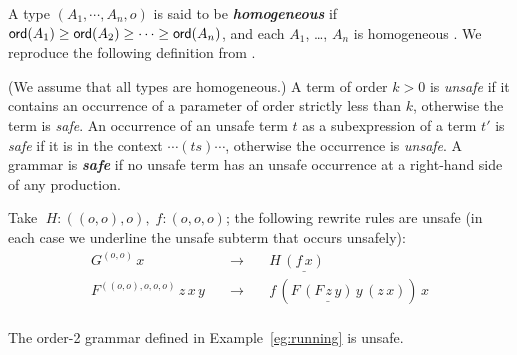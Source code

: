 \documentclass{llncs}
\newcommand\defname[1]{{\bf\em #1}\index{#1}}
\begin{document}
A type $(A_1, \cdots, A_n, o)$ is said to be \defname{homogeneous} if
${\sf ord}(A_1) \geq {\sf ord}(A_2)\geq \cdots \geq {\sf ord}(A_n)$, and each $A_1$,
\ldots, $A_n$ is homogeneous \cite{KNU02}.  We reproduce the following
definition from \cite{KNU02}.

\begin{definition}\rm
  (We assume that all types are homogeneous.) A term of order $k > 0$
  is \emph{unsafe} if it contains an occurrence of a parameter of
  order strictly less than $k$, otherwise the term is \emph{safe}. An
  occurrence of an unsafe term $t$ as a subexpression of a term $t'$
  is \emph{safe} if it is in the context $\cdots (ts) \cdots$,
  otherwise the occurrence is \emph{unsafe}. A grammar is
  \defname{safe} if no unsafe term has an unsafe occurrence at a
  right-hand side of any production.
\end{definition}

\begin{example}\begin{inparaenum}[(i)] \item Take $\; H : ((o, o), o), \; f : (o, o, o)$; the
    following rewrite rules are unsafe (in each case we underline the
    unsafe subterm that occurs unsafely):
\[\begin{array}{rll}
G^{(o, o)} \, x & \quad \rightarrow \quad & H \, \underline{(f \, {x})} \\
F^{((o, o), o, o, o)} \, z \, x \, y & \quad \rightarrow \quad & f \, (F \, \underline{(F \, z
\, {y})} \, y \, (z \, x) ) \, x \\
\end{array}\]
\item The order-2 grammar defined in Example~\ref{eg:running} is
  unsafe.
\end{inparaenum}
\end{example}
\end{document}

